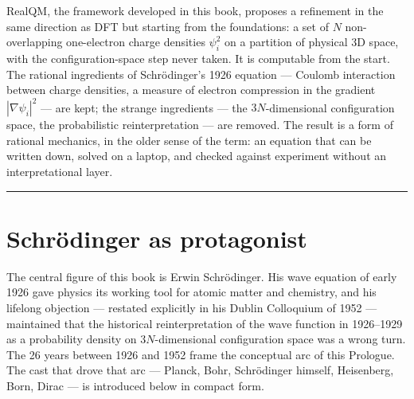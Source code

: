 RealQM, the framework developed in this book, proposes a refinement in the same direction as DFT but starting from the foundations: a set of $N$ non-overlapping one-electron charge densities $\psi_i^2$ on a partition of physical 3D space, with the configuration-space step never taken. It is computable from the start. The rational ingredients of Schr\"odinger's 1926 equation --- Coulomb interaction between charge densities, a measure of electron compression in the gradient $|\nabla \psi_i|^2$ --- are kept; the strange ingredients --- the $3N$-dimensional configuration space, the probabilistic reinterpretation --- are removed. The result is a form of rational mechanics, in the older sense of the term: an equation that can be written down, solved on a laptop, and checked against experiment without an interpretational layer.

\bigskip
\hrule
\bigskip

\section*{Schr\"odinger as protagonist}\label{sec:prologue-protagonist}

The central figure of this book is Erwin Schr\"odinger. His wave equation of early 1926 gave physics its working tool for atomic matter and chemistry, and his lifelong objection --- restated explicitly in his Dublin Colloquium of 1952 --- maintained that the historical reinterpretation of the wave function in 1926--1929 as a probability density on $3N$-dimensional configuration space was a wrong turn. The 26 years between 1926 and 1952 frame the conceptual arc of this Prologue. The cast that drove that arc --- Planck, Bohr, Schr\"odinger himself, Heisenberg, Born, Dirac --- is introduced below in compact form.

